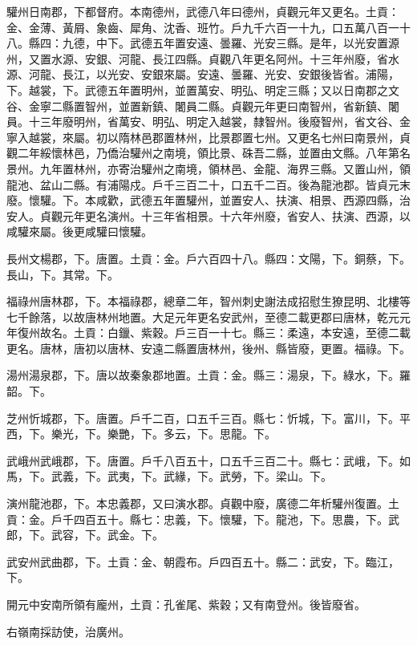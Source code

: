 \begin{pinyinscope}
 驩州日南郡，下都督府。本南德州，武德八年曰德州，貞觀元年又更名。土貢：金、金薄、黃屑、象齒、犀角、沈香、班竹。戶九千六百一十九，口五萬八百一十八。縣四：九德，中下。武德五年置安遠、曇羅、光安三縣。是年，以光安置源州，又置水源、安銀、河龍、長江四縣。貞觀八年更名阿州。十三年州廢，省水源、河龍、長江，以光安、安銀來屬。安遠、曇羅、光安、安銀後皆省。浦陽，下。越裳，下。武德五年置明州，並置萬安、明弘、明定三縣；又以日南郡之文谷、金寧二縣置智州，並置新鎮、闍員二縣。貞觀元年更曰南智州，省新鎮、闍員。十三年廢明州，省萬安、明弘、明定入越裳，隸智州。後廢智州，省文谷、金寧入越裳，來屬。初以隋林邑郡置林州，比景郡置七州。又更名七州曰南景州，貞觀二年綏懷林邑，乃僑治驩州之南境，領比景、硃吾二縣，並置由文縣。八年第名景州。九年置林州，亦寄治驩州之南境，領林邑、金龍、海界三縣。又置山州，領龍池、盆山二縣。有浦陽戍。戶千三百二十，口五千二百。後為龍池郡。皆貞元末廢。懷驩。下。本咸歡，武德五年置驩州，並置安人、扶演、相景、西源四縣，治安人。貞觀元年更名演州。十三年省相景。十六年州廢，省安人、扶演、西源，以咸驩來屬。後更咸驩曰懷驩。



 長州文楊郡，下。唐置。土貢：金。戶六百四十八。縣四：文陽，下。銅蔡，下。長山，下。其常。下。



 福祿州唐林郡，下。本福祿郡，總章二年，智州刺史謝法成招慰生獠昆明、北樓等七千餘落，以故唐林州地置。大足元年更名安武州，至德二載更郡曰唐林，乾元元年復州故名。土貢：白鑞、紫穀。戶三百一十七。縣三：柔遠，本安遠，至德二載更名。唐林，唐初以唐林、安遠二縣置唐林州，後州、縣皆廢，更置。福祿。下。



 湯州湯泉郡，下。唐以故秦象郡地置。土貢：金。縣三：湯泉，下。綠水，下。羅韶。下。



 芝州忻城郡，下。唐置。戶千二百，口五千三百。縣七：忻城，下。富川，下。平西，下。樂光，下。樂艷，下。多云，下。思龍。下。



 武峨州武峨郡，下。唐置。戶千八百五十，口五千三百二十。縣七：武峨，下。如馬，下。武義，下。武夷，下。武緣，下。武勞，下。梁山。下。



 演州龍池郡，下。本忠義郡，又曰演水郡。貞觀中廢，廣德二年析驩州復置。土貢：金。戶千四百五十。縣七：忠義，下。懷驩，下。龍池，下。思農，下。武郎，下。武容，下。武金。下。



 武安州武曲郡，下。土貢：金、朝霞布。戶四百五十。縣二：武安，下。臨江，下。



 開元中安南所領有龐州，土貢：孔雀尾、紫穀；又有南登州。後皆廢省。



 右嶺南採訪使，治廣州。



\end{pinyinscope}